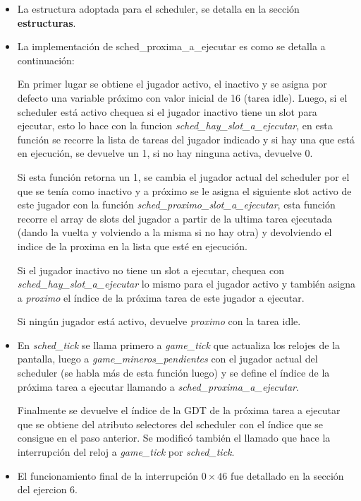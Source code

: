 \begin{itemize}

\item La estructura adoptada para el scheduler, se detalla en la sección {\bf estructuras}.

\item La implementación de sched_proxima_a_ejecutar es como se detalla a
continuación:

  En primer lugar se obtiene el jugador activo, el inactivo y se asigna por defecto
  una variable próximo con valor inicial de 16 (tarea idle). Luego, si el
  scheduler está activo chequea si el jugador inactivo tiene un slot para
  ejecutar, esto lo hace con la funcion {\it sched_hay_slot_a_ejecutar\/}, en esta
  función se recorre la lista de tareas del jugador indicado y si hay una que
  está en ejecución, se devuelve un 1, si no hay ninguna activa, devuelve 0.

  Si esta función retorna un 1, se cambia el jugador actual del scheduler por el
  que se tenía como inactivo y a próximo se le asigna el siguiente slot activo
  de este jugador con la función {\it sched_proximo_slot_a_ejecutar\/}, esta función
  recorre el array de slots del jugador a partir de la ultima tarea ejecutada
  (dando la vuelta y volviendo a la misma si no hay otra) y devolviendo el indice
  de la proxima en la lista que esté en ejecución.

  Si el jugador inactivo no tiene un slot a ejecutar, chequea con
  {\it sched_hay_slot_a_ejecutar\/} lo mismo para el jugador activo y
  también asigna a {\it proximo\/} el índice de la próxima tarea de este jugador a
  ejecutar.

  Si ningún jugador está activo, devuelve {\it proximo\/} con la tarea idle.

\item En {\it sched_tick\/} se llama primero a {\it game_tick\/} que actualiza los
relojes de la pantalla, luego a
  {\it game_mineros_pendientes\/} con el jugador actual del scheduler (se habla más
  de esta función luego) y se define el índice de la próxima tarea a ejecutar
  llamando a {\it sched_proxima_a_ejecutar\/}.

  Finalmente se devuelve el índice de la GDT de la próxima tarea a ejecutar que
  se obtiene del atributo selectores del scheduler con el índice que se consigue
  en el paso anterior. Se modificó también el llamado que hace la interrupción
  del reloj a {\it game_tick\/} por {\it sched_tick\/}.

\item El funcionamiento final de la interrupción $0\times46$ fue detallado en
 la sección del ejercion 6.


\end{itemize}
